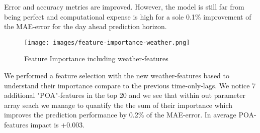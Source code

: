 Error and accuracy metrics are improved. However, the model is still far from being perfect 
and computational expense is high for a sole 0.1\% improvement of the MAE-error for the day ahead 
prediction horizon. 

\begin{figure}[H]
    \centering
    \texttt{[image: images/feature-importance-weather.png]}
    \caption{Feature Importance including weather-features}
    \label{fig:feature-importance-weather}
\end{figure}

We performed a feature selection with the new weather-features based to understand their importance 
compare to the previous time-only-lags. We notice 7 additional "POA"-features in the top 20 and we see 
that within out parameter array seach we manage to quantify the the sum of their importance which 
improves the prediction performance by 0.2\% of the MAE-error. In average POA-features impact is +0.003.




